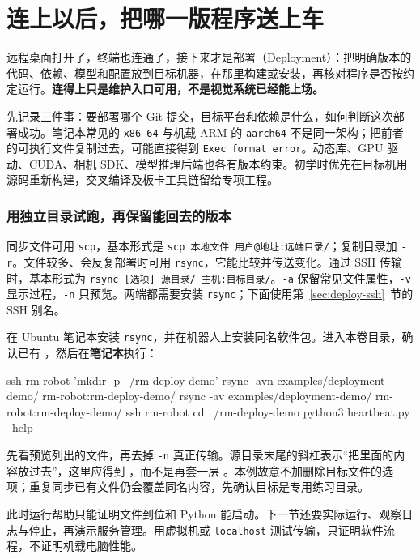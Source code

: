 \section{连上以后，把哪一版程序送上车}
\label{sec:deploy-delivery}

远程桌面打开了，终端也连通了，接下来才是部署（Deployment）：把明确版本的代码、依赖、模型和配置放到目标机器，在那里构建或安装，再核对程序是否按约定运行。\textbf{连得上只是维护入口可用，不是视觉系统已经能上场。}

先记录三件事：要部署哪个 Git 提交，目标平台和依赖是什么，如何判断这次部署成功。笔记本常见的 \texttt{x86\_64} 与机载 ARM 的 \texttt{aarch64} 不是同一架构；把前者的可执行文件复制过去，可能直接得到 \texttt{Exec format error}。动态库、GPU 驱动、CUDA、相机 SDK、模型推理后端也各有版本约束。初学时优先在目标机用源码重新构建，交叉编译及板卡工具链留给专项工程。

\subsubsection{用独立目录试跑，再保留能回去的版本}

同步文件可用 \texttt{scp}，基本形式是 \texttt{scp 本地文件 用户@地址:远端目录/}；复制目录加 \texttt{-r}。文件较多、会反复部署时可用 \texttt{rsync}，它能比较并传送变化。通过 SSH 传输时，基本形式为 \texttt{rsync [选项] 源目录/ 主机:目标目录/}。\texttt{-a} 保留常见文件属性，\texttt{-v} 显示过程，\texttt{-n} 只预览。两端都需要安装 \texttt{rsync}；下面使用第~\ref{sec:deploy-ssh}~节的 SSH 别名。

\begin{example}
在 Ubuntu 笔记本安装 \texttt{rsync}，并在机器人上安装同名软件包。进入本卷目录，确认已有 ，然后在\textbf{笔记本}执行：
\begin{tbash}
ssh rm-robot 'mkdir -p ~/rm-deploy-demo'
rsync -avn examples/deployment-demo/ rm-robot:rm-deploy-demo/
rsync -av examples/deployment-demo/ rm-robot:rm-deploy-demo/
ssh rm-robot
cd ~/rm-deploy-demo
python3 heartbeat.py --help
\end{tbash}
先看预览列出的文件，再去掉 \texttt{-n} 真正传输。源目录末尾的斜杠表示“把里面的内容放过去”，这里应得到 ，而不是再套一层 。本例故意不加删除目标文件的选项；重复同步已有文件仍会覆盖同名内容，先确认目标是专用练习目录。

此时运行帮助只能证明文件到位和 Python 能启动。下一节还要实际运行、观察日志与停止，再演示服务管理。用虚拟机或 \texttt{localhost} 测试传输，只证明软件流程，不证明机载电脑性能。
\end{example}

